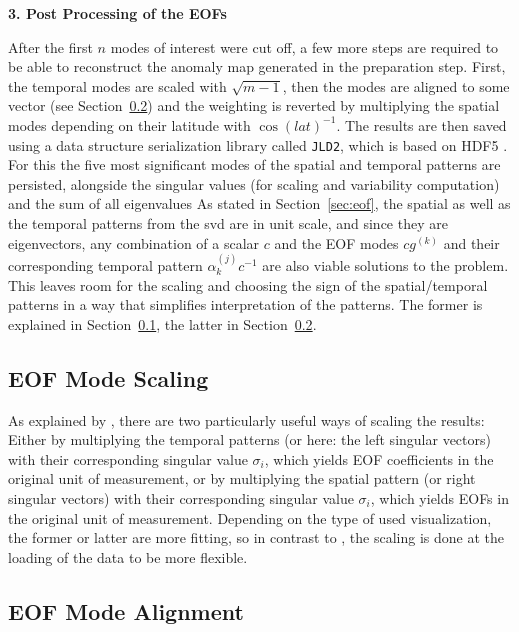 \textbf{3. Post Processing of the EOFs}

After the first $n$ modes of interest were cut off, a few more steps are required to be able to reconstruct the anomaly map generated in the preparation step.  
First, the temporal modes are scaled with $\sqrt{m-1}$, then the modes are aligned to some vector (see Section~\ref{sec:mode_alignment}) and the weighting is reverted by multiplying the spatial modes depending on their latitude with $\cos(lat)^{-1}$.
The results are then saved using a data structure serialization library called \texttt{JLD2}, which is based on HDF5 \cite{noauthor_juliaiojld2jl_2024}. 
For this the five most significant modes of the spatial and temporal patterns are persisted, alongside the singular values (for scaling and variability computation) and the sum of all eigenvalues
As stated in Section~\ref{sec:eof}, the spatial as well as the temporal patterns from the \ac{svd} are in unit scale, and since they are eigenvectors, any combination of a scalar $c$ and the EOF modes $cg^{(k)}$ and their corresponding temporal pattern $\alpha^{(j)}_k c^{-1}$ are also viable solutions to the problem. 
This leaves room for the scaling and choosing the sign of the spatial/temporal patterns in a way that simplifies interpretation of the patterns. 
The former is explained in Section~\ref{sec:mode_scaling}, the latter  in Section~\ref{sec:mode_alignment}.

\subsection{EOF Mode Scaling}
\label{sec:mode_scaling}

As explained by , there are two particularly useful ways of scaling the results: 
Either by multiplying the temporal patterns (or here: the left singular vectors) with their corresponding singular value $\sigma_i$, which yields EOF coefficients in the original unit of measurement, or by multiplying the spatial pattern (or right singular vectors) with their corresponding singular value $\sigma_i$, which yields EOFs in the original unit of measurement. 
Depending on the type of used visualization, the former or latter are more fitting, so in contrast to \cite{vietinghoffdiss}, the scaling is done at the loading of the data to be more flexible.

\subsection{EOF Mode Alignment}
\label{sec:mode_alignment}

